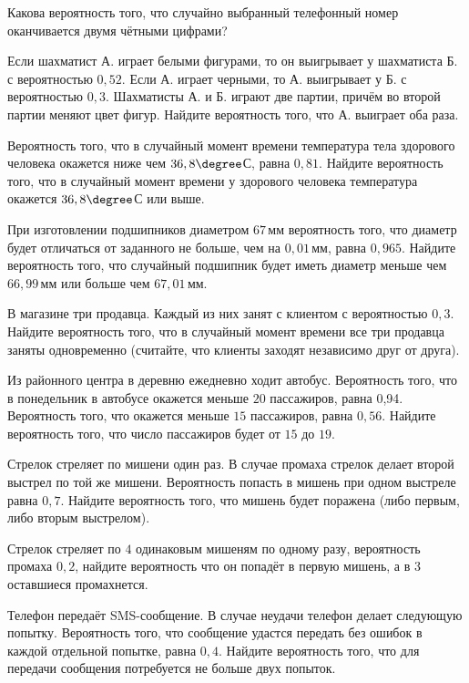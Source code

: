 \begin{consultation}
	\begin{listofex}
		\item Какова вероятность того, что случайно выбранный телефонный номер оканчивается двумя чётными цифрами?
		\item Если шахматист А. играет белыми фигурами, то он выигрывает у шахматиста Б. с вероятностью \( 0,52 \). Если А. играет черными, то А. выигрывает у Б. с вероятностью \( 0,3 \). Шахматисты А. и Б. играют две партии, причём во второй партии меняют цвет фигур. Найдите вероятность того, что А. выиграет оба раза.
		\item Вероятность того, что в случайный момент времени температура тела здорового человека окажется ниже чем \( 36,8\degree \)С, равна \( 0,81 \). Найдите вероятность того, что в случайный момент времени у здорового человека температура окажется \( 36,8\degree \)С или выше.
		\item При изготовлении подшипников диаметром \( 67 \) мм вероятность того, что диаметр будет отличаться от заданного не больше, чем на \( 0,01 \) мм, равна \( 0,965 \). Найдите вероятность того, что случайный подшипник будет иметь диаметр меньше чем \( 66,99 \) мм или больше чем \( 67,01 \) мм.
		\item В магазине три продавца. Каждый из них занят с клиентом с вероятностью \( 0,3 \). Найдите вероятность того, что в случайный момент времени все три продавца заняты одновременно (считайте, что клиенты заходят независимо друг от друга).
		\item Из районного центра в деревню ежедневно ходит автобус. Вероятность того, что в понедельник в автобусе окажется меньше \( 20 \) пассажиров, равна 0,94. Вероятность того, что окажется меньше \( 15 \) пассажиров, равна \( 0,56 \). Найдите вероятность того, что число пассажиров будет от \( 15 \) до \( 19 \).
		\item Стрелок стреляет по мишени один раз. В случае промаха стрелок делает второй выстрел по той же мишени. Вероятность попасть в мишень при одном выстреле равна \( 0,7 \). Найдите вероятность того, что мишень будет поражена (либо первым, либо вторым выстрелом).
		\item Стрелок стреляет по \( 4 \) одинаковым мишеням по одному разу, вероятность промаха \( 0,2 \), найдите вероятность что он попадёт в первую мишень, а в \( 3 \) оставшиеся промахнется.
		\item Телефон передаёт SMS-сообщение. В случае неудачи телефон делает следующую попытку. Вероятность того, что сообщение удастся передать без ошибок в каждой отдельной попытке, равна \( 0,4 \). Найдите вероятность того, что для передачи сообщения потребуется не больше двух попыток.

\end{listofex}
\end{consultation}
